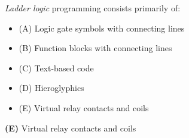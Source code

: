 

{\it Ladder logic} programming consists primarily of:

\begin{itemize}
\item{(A)} Logic gate symbols with connecting lines
\vskip 5pt 
\item{(B)} Function blocks with connecting lines
\vskip 5pt 
\item{(C)} Text-based code
\vskip 5pt 
\item{(D)} Hieroglyphics
\vskip 5pt 
\item{(E)} Virtual relay contacts and coils
\end{itemize}







{\bf (E)} Virtual relay contacts and coils
 











